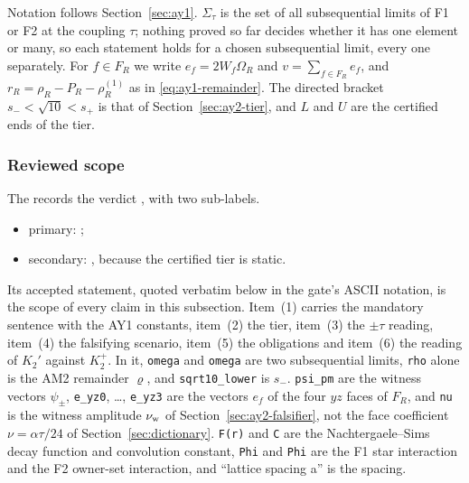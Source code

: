 Notation follows Section~\ref{sec:ay1}. $\Sigma_\tau$ is the set of all
subsequential limits of F1 or F2 at the coupling $\tau$; nothing proved so far
decides whether it has one element or many, so each statement holds for a
chosen subsequential limit, every one separately. For $f\in F_R$ we write
$e_f=2W_f\Omega_R$ and $v=\sum_{f\in F_R}e_f$, and
$r_R=\rho_R-P_R-\rho^{(1)}_R$ as in \eqref{eq:ay1-remainder}. The directed
bracket $s_-<\sqrt{10}<s_+$ is that of Section~\ref{sec:ay2-tier}, and $L$ and
$U$ are the certified ends of the tier.

\subsubsection{Reviewed scope}
\label{sec:ay2-scope}
The  records the
verdict , with two sub-labels.
\begin{itemize}\raggedright
\item primary: ;
\item secondary: , because the certified tier is
 static.
\end{itemize}
Its accepted statement, quoted verbatim below in the gate's ASCII notation, is the scope of
every claim in this subsection. Item~(1) carries the mandatory sentence with
the AY1 constants, item~(2) the tier, item~(3) the $\pm\tau$ reading, item~(4)
the falsifying scenario, item~(5) the obligations and item~(6) the reading of
$K_2'$ against $K_2^+$. In it, \texttt{omega\textquotesingle{}} and
\texttt{omega\textquotesingle{}\textquotesingle{}} are two subsequential limits,
\texttt{rho} alone is the AM2 remainder $\varrho$, and
\texttt{sqrt10\_lower} is $s_-$. \texttt{psi\_pm} are the witness vectors
$\psi_\pm$, \texttt{e\_yz0}, \ldots, \texttt{e\_yz3} are the vectors $e_f$ of
the four $yz$ faces of $F_R$, and \texttt{nu} is the witness amplitude
$\nu_{\rm w}$ of Section~\ref{sec:ay2-falsifier}, not the face coefficient
$\nu=\alpha\tau/24$ of Section~\ref{sec:dictionary}. \texttt{F(r)} and
\texttt{C} are the Nachtergaele--Sims decay function and convolution
constant, \texttt{Phi} and \texttt{Phi\textquotesingle{}} are the F1 star
interaction and the F2 owner-set interaction, and ``lattice spacing a'' is the
spacing.
